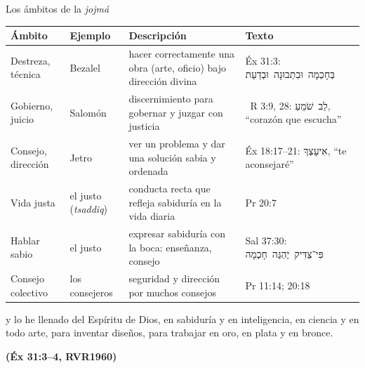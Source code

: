 \documentclass[hyperref={bookmarks=false},aspectratio=169]{beamer}
\newcommand{\heb}[1]{\mbox{\foreignlanguage{hebrew}{#1}}}
\newcommand{\fuente}[1]{\par\hfill{\upshape\bfseries\footnotesize\textcolor{azul}{#1}}}
\begin{document}
\begin{frame}{Los ámbitos de la \emph{jojmá}}
\scriptsize\renewcommand{\arraystretch}{1.2}
\begin{tabular}{@{}>{\RaggedRight\arraybackslash}p{2.0cm}>{\RaggedRight\arraybackslash}p{1.9cm}>{\RaggedRight\arraybackslash}p{4.6cm}>{\RaggedRight\arraybackslash}p{3.2cm}@{}}
\toprule
\textbf{Ámbito} & \textbf{Ejemplo} & \textbf{Descripción} & \textbf{Texto} \\ \midrule
Destreza, técnica & Bezalel & hacer correctamente una obra (arte, oficio) bajo dirección divina & Éx 31:3: \heb{בְּחָכְמָה וּבִתְבוּנָה וּבְדַעַת} \\
Gobierno, juicio & Salomón & discernimiento para gobernar y juzgar con justicia & 1~R 3:9, 28: \heb{לֵב שֹׁמֵעַ}, ``corazón que escucha'' \\
Consejo, dirección & Jetro & ver un problema y dar una solución sabia y ordenada & Éx 18:17--21: \heb{אִיעָצְךָ}, ``te aconsejaré'' \\
Vida justa & el justo (\emph{tsaddiq}) & conducta recta que refleja sabiduría en la vida diaria & Pr 20:7 \\
Hablar sabio & el justo & expresar sabiduría con la boca: enseñanza, consejo & Sal 37:30: \heb{פִּי־צַדִּיק יֶהְגֶּה חָכְמָה} \\
Consejo colectivo & los consejeros & seguridad y dirección por muchos consejos & Pr 11:14; 20:18 \\
\bottomrule
\end{tabular}\par\medskip
\begin{cita}y lo he llenado del Espíritu de Dios, en sabiduría y en inteligencia, en ciencia y en todo arte, para inventar diseños, para trabajar en oro, en plata y en bronce.\fuente{(Éx 31:3--4, RVR1960)}\end{cita}
\end{frame}
\end{document}

